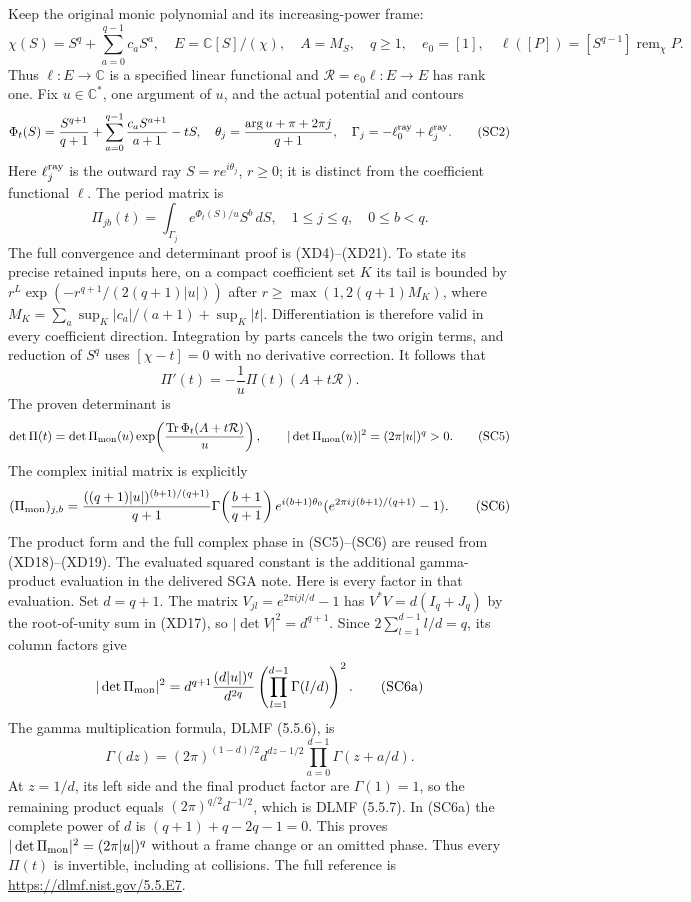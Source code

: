 Keep the original monic polynomial and its increasing-power frame:
\[
 \chi(S)=S^q+\sum_{a=0}^{q-1}c_aS^a,
 \quad E=\mathbb C[S]/(\chi),\quad A=M_S,\quad q\geq1,
 \quad e_0=[1],\quad
 \ell([P])=[S^{q-1}]\operatorname{rem}_{\chi}P.
 \tag{SC1}
\]
Thus $\ell:E\to\mathbb C$ is a specified linear functional and
$\mathcal R=e_0\ell:E\to E$ has rank one.  Fix $u\in\mathbb C^*$,
one argument of $u$, and the actual potential and contours
\[
 \Phi_t(S)=\frac{S^{q+1}}{q+1}
   +\sum_{a=0}^{q-1}\frac{c_aS^{a+1}}{a+1}-tS,
 \quad \theta_j=\frac{\arg u+\pi+2\pi j}{q+1},
 \quad\Gamma_j=-\ell_0^{\rm ray}+\ell_j^{\rm ray}.
 \tag{SC2}
\]
Here $\ell_j^{\rm ray}$ is the outward ray $S=re^{i\theta_j}$,
$r\geq0$; it is distinct from the coefficient functional $\ell$.
The period matrix is
\[
 \Pi_{jb}(t)=\int_{\Gamma_j}e^{\Phi_t(S)/u}S^b\,dS,
 \quad 1\leq j\leq q,\quad0\leq b<q.
 \tag{SC3}
\]
The full convergence and determinant proof is (XD4)--(XD21).  To
state its precise retained inputs here, on a compact coefficient set
$K$ its tail is bounded by
$r^L\exp(-r^{q+1}/(2(q+1)|u|))$ after
$r\geq\max(1,2(q+1)M_K)$, where
$M_K=\sum_a\sup_K|c_a|/(a+1)+\sup_K|t|$.
Differentiation is therefore valid in every coefficient direction.
Integration by parts cancels the two origin terms, and reduction of
$S^q$ uses $[\chi-t]=0$ with no derivative correction.  It follows that
\[
 \Pi'(t)=-\frac1u\Pi(t)(A+t\mathcal R).
 \tag{SC4}
\]
The proven determinant is
\[
 \det\Pi(t)=\det\Pi_{\rm mon}(u)
    \exp\!\left(\frac{\operatorname{Tr}\Phi_t(A+t\mathcal R)}u\right),
 \qquad |\det\Pi_{\rm mon}(u)|^2=(2\pi|u|)^q>0.
 \tag{SC5}
\]
The complex initial matrix is explicitly
\[
 (\Pi_{\rm mon})_{j,b}
 =\frac{((q+1)|u|)^{(b+1)/(q+1)}}{q+1}
   \Gamma\!\left(\frac{b+1}{q+1}\right)
   e^{i(b+1)\theta_0}
   (e^{2\pi i j(b+1)/(q+1)}-1).
 \tag{SC6}
\]
The product form and the full complex phase in (SC5)--(SC6) are
reused from (XD18)--(XD19).  The evaluated squared constant is the
additional gamma-product evaluation in the delivered SGA note.
Here is every factor in that evaluation.  Set $d=q+1$.  The matrix
$V_{jl}=e^{2\pi i jl/d}-1$ has $V^*V=d(I_q+J_q)$ by the root-of-unity
sum in (XD17), so $|\det V|^2=d^{q+1}$.  Since
$2\sum_{l=1}^{d-1}l/d=q$, its column factors give
\[
 |\det\Pi_{\rm mon}|^2
 =d^{q+1}\frac{(d|u|)^q}{d^{2q}}
       \left(\prod_{l=1}^{d-1}\Gamma(l/d)\right)^2.
 \tag{SC6a}
\]
The gamma multiplication formula, DLMF (5.5.6), is
\[
 \Gamma(dz)=(2\pi)^{(1-d)/2}d^{dz-1/2}
                   \prod_{a=0}^{d-1}\Gamma(z+a/d).
 \tag{SC6b}
\]
At $z=1/d$, its left side and the final product factor are
$\Gamma(1)=1$, so the remaining product equals
$(2\pi)^{q/2}d^{-1/2}$, which is DLMF (5.5.7).
In (SC6a) the complete power of $d$
is $(q+1)+q-2q-1=0$.  This proves
$|\det\Pi_{\rm mon}|^2=(2\pi|u|)^q$ without a frame change or
an omitted phase.  Thus every $\Pi(t)$ is invertible, including
at collisions.  The full reference is
\url{https://dlmf.nist.gov/5.5.E7}.

